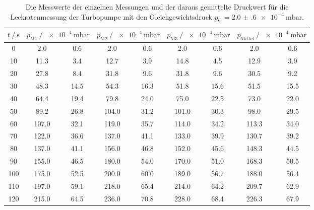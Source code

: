   \begin{table}[h]
    \centering
    \caption{Die Messwerte der einzelnen Messungen und der daraus gemittelte Druckwert für die Leckratenmessung der Turbopumpe mit den Gleichgewichtsdruck
              $p_\text{G} = \SI{2.0(6)e-4}{\milli\bar}$.}
    \label{tab:turbo_leck_2}
    \begin{tabular}{S[table-format=3.0] S @{${}\pm{}$} S S @{${}\pm{}$} S S @{${}\pm{}$} S S[table-format=5.1] @{${}\pm{}$} S[table-format=4.1]}
    \toprule
    {$t \mathbin{/} \si{\second} $} &  &  &  &  \\
       &   2.0 &  0.6 &   2.0 &  0.6 &   2.0 &  0.6 &   2.0 &  0.6 \\
    10  &  11.3 &  3.4 &  12.7 &  3.9 &  14.8 &  4.5 &  12.9 &  3.9 \\
    20  &  27.8 &  8.4 &  31.8 &  9.6 &  31.8 &  9.6 &  30.5 &  9.2 \\
    30  &  48.3 & 14.5 &  54.3 & 16.3 &  51.8 & 15.6 &  51.5 & 15.5 \\
    40  &  64.4 & 19.4 &  79.8 & 24.0 &  75.0 & 22.5 &  73.0 & 22.0 \\
    50  &  89.2 & 26.8 & 104.0 & 31.2 & 101.0 & 30.3 &  98.0 & 29.5 \\
    60  & 107.0 & 32.1 & 119.0 & 35.7 & 114.0 & 34.2 & 113.3 & 34.0 \\
    70  & 122.0 & 36.6 & 137.0 & 41.1 & 133.0 & 39.9 & 130.7 & 39.2 \\
    80  & 137.0 & 41.1 & 156.0 & 46.8 & 152.0 & 45.6 & 148.3 & 44.5 \\
    90  & 155.0 & 46.5 & 180.0 & 54.0 & 170.0 & 51.0 & 168.3 & 50.5 \\
    100 & 175.0 & 52.5 & 200.0 & 60.0 & 189.0 & 56.7 & 188.0 & 56.4 \\
    110 & 197.0 & 59.1 & 218.0 & 65.4 & 214.0 & 64.2 & 209.7 & 62.9 \\
    120 & 215.0 & 64.5 & 236.0 & 70.8 & 228.0 & 68.4 & 226.3 & 67.9 \\

\end{tabular}
\end{table}
